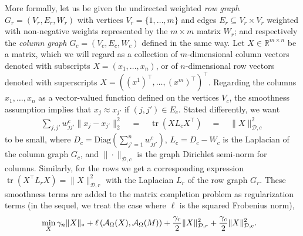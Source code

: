 \documentclass{article}
\DeclareMathOperator{\tr}{tr}
\begin{document}
More formally, let us be given the undirected weighted {\em row graph} $G_r = (V_r, E_r, W_r)$ with vertices $V_r = \{1, \hdots, m\}$ and edges $E_r \subseteq V_r \times V_r$ weighted with non-negative weights represented by the $m \times m$  matrix $W_r$; and respectively the {\em column graph} $G_c = (V_c, E_c, W_c)$ defined in the same way.  Let $X \in \mathbb{R}^{m\times n}$ be a matrix, which we will regard as a collection of $m$-dimensional column vectors denoted with subscripts $X = (x_1, \hdots, x_n)$, or of $n$-dimensional row vectors denoted with superscripts $X = ((x^1)^\top, \hdots,  (x^m)^\top)^\top$. Regarding the columns $x_1, \hdots, x_n$ as a vector-valued function defined on the vertices $V_c$, the smoothness assumption implies that $x_j \approx x_{j'}$ if $(j,j') \in E_c$. Stated differently, we want 
\vspace{-0.15cm}
\begin{eqnarray}
\sum_{j,j'} w^c_{jj'} \| x_j - x_{j'} \|_2^2 \quad = \quad \tr(X L_c X^\top) \quad = \quad \|X\|^2_{\mathcal{D},c}
\label{eq:priorc}
\end{eqnarray}
\vspace{-0.07cm}to be small, where $D_c=\mathrm{Diag}(\sum_{j'=1}^n w^c_{jj'})$, $L_c = D_c - W_c$ is the Laplacian of the column graph $G_c$, and $\|\cdot\|_{\mathcal{D},c}$ is the graph Dirichlet semi-norm for columns. Similarly, for the rows we get a corresponding expression $\tr(X^\top L_r X)=\|X\|^2_{\mathcal{D},r}$ with the Laplacian $L_r$ of the row graph $G_r$. These smoothness terms are added to the matrix completion problem as regularization terms (in the sequel, we treat the case where $\ell$ is the squared Frobenius norm), 
\vspace{-0.07cm}
\begin{align}
&\min_X 				\gamma_n\|X\|_* + \ell\left({\cal A}_{\Omega}(X), {\cal A}_{\Omega}(M)\right) +  \frac{\gamma_r}{2} \|X\|^2_{\mathcal{D},r} + \frac{\gamma_c}{2} \|X\|^2_{\mathcal{D},c}. \label{eq:problem2}
\end{align}
\vspace{-0.55cm}
\end{document}
